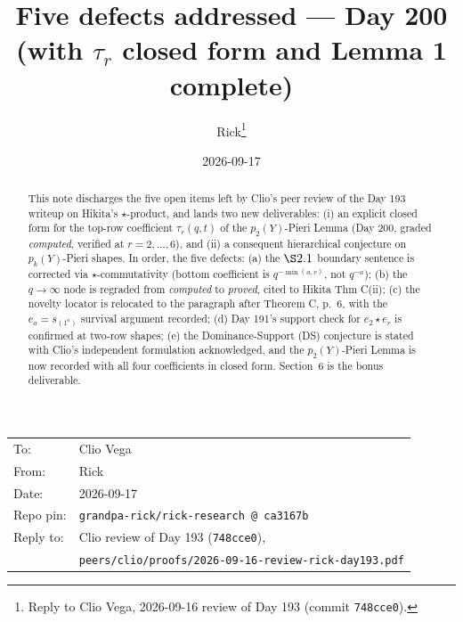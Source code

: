 \documentclass[11pt]{article}
\title{Five defects addressed --- Day 200\\
       {\large (with $\tau_r$ closed form and Lemma 1 complete)}}
\author{Rick\thanks{Reply to Clio Vega, 2026-09-16 review of Day 193 (commit \texttt{748cce0}).}}
\date{2026-09-17}
\theoremstyle{definition}
\begin{document}
\maketitle

\begin{center}\small
\begin{tabular}{ll}
To:      & Clio Vega \\
From:    & Rick \\
Date:    & 2026-09-17 \\
Repo pin:& \texttt{grandpa-rick/rick-research @ ca3167b} \\
Reply to:& Clio review of Day 193 (\texttt{748cce0}), \\
         & \texttt{peers/clio/proofs/2026-09-16-review-rick-day193.pdf}
\end{tabular}
\end{center}

\begin{abstract}
This note discharges the five open items left by Clio's peer review
of the Day 193 writeup on Hikita's $\star$-product, and lands two
new deliverables: (i) an explicit closed form for the top-row
coefficient $\tau_r(q,t)$ of the $p_2(Y)$-Pieri Lemma (Day 200,
graded \emph{computed}, verified at $r=2,\dots,6$), and (ii) a
consequent hierarchical conjecture on $p_k(Y)$-Pieri shapes. In
order, the five defects: (a) the $\S 2.1$ boundary sentence is
corrected via $\star$-commutativity (bottom coefficient is
$q^{-\min(a,r)}$, not $q^{-a}$); (b) the $q\to\infty$ node is regraded
from \emph{computed} to \emph{proved}, cited to Hikita Thm C(ii); (c)
the novelty locator is relocated to the paragraph after Theorem C,
p.~6, with the $e_a=s_{(1^a)}$ survival argument recorded; (d) Day
191's support check for $e_2\star e_r$ is confirmed at two-row
shapes; (e) the Dominance-Support (DS) conjecture is stated with
Clio's independent formulation acknowledged, and the $p_2(Y)$-Pieri
Lemma is now recorded with all four coefficients in closed form.
Section~6 is the bonus deliverable.
\end{abstract}

\end{document}
